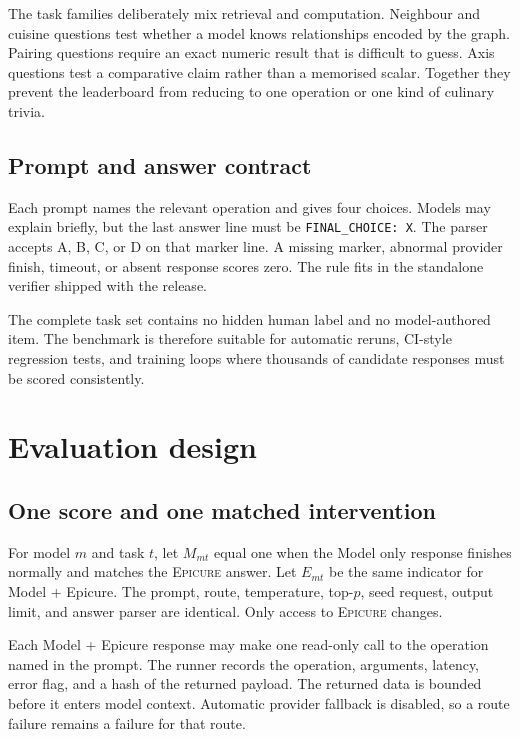 \documentclass[10pt,twocolumn]{article}
\newcommand{\epicure}{\textsc{Epicure}}
\begin{document}
The task families deliberately mix retrieval and computation. Neighbour and cuisine questions test
whether a model knows relationships encoded by the graph. Pairing questions require an exact
numeric result that is difficult to guess. Axis questions test a comparative claim rather than a
memorised scalar. Together they prevent the leaderboard from reducing to one operation or one
kind of culinary trivia.

\subsection{Prompt and answer contract}

Each prompt names the relevant operation and gives four choices. Models may explain briefly, but
the last answer line must be \texttt{FINAL\_CHOICE: X}. The parser accepts A, B, C, or D on that
marker line. A missing marker, abnormal provider finish, timeout, or absent response scores zero.
The rule fits in the standalone verifier shipped with the release.

The complete task set contains no hidden human label and no model-authored item. The benchmark is
therefore suitable for automatic reruns, CI-style regression tests, and training loops where
thousands of candidate responses must be scored consistently.

\section{Evaluation design}
\label{sec:design}

\subsection{One score and one matched intervention}

For model $m$ and task $t$, let $M_{mt}$ equal one when the Model only response finishes normally
and matches the \epicure{} answer. Let $E_{mt}$ be the same indicator for Model + Epicure. The
prompt, route, temperature, top-$p$, seed request, output limit, and answer parser are identical.
Only access to \epicure{} changes.

Each Model + Epicure response may make one read-only call to the operation named in the prompt. The
runner records the operation, arguments, latency, error flag, and a hash of the returned payload.
The returned data is bounded before it enters model context. Automatic provider fallback is
disabled, so a route failure remains a failure for that route.
\end{document}
